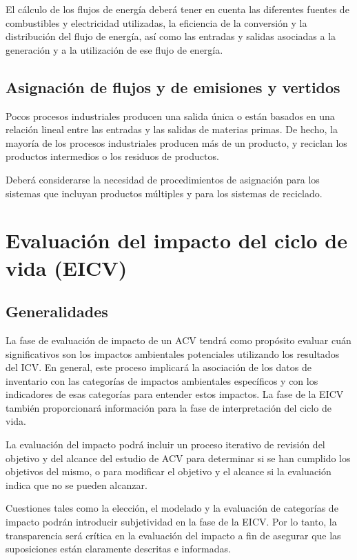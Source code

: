 El cálculo de los flujos de energía deberá tener en cuenta las diferentes fuentes de combustibles y electricidad utilizadas, la eficiencia de la conversión y la distribución del flujo de energía, así como las entradas y salidas asociadas a la generación y a la utilización de ese flujo de energía.

\subsection{Asignación de flujos y de emisiones y vertidos}
Pocos procesos industriales producen una salida única o están basados en una relación lineal entre las entradas y las salidas de materias primas. De hecho, la mayoría de los procesos industriales producen más de un producto, y reciclan los productos intermedios o los residuos de productos.

Deberá considerarse la necesidad de procedimientos de asignación para los sistemas que incluyan productos múltiples y para los sistemas de reciclado.

\section{Evaluación del impacto del ciclo de vida (EICV)}
\subsection{Generalidades}
La fase de evaluación de impacto de un ACV tendrá como propósito evaluar cuán significativos son los impactos ambientales potenciales utilizando los resultados del ICV. En general, este proceso implicará la asociación de los datos de inventario con las categorías de impactos ambientales específicos y con los indicadores de esas categorías para entender estos impactos. La fase de la EICV también proporcionará información para la fase de interpretación del ciclo de vida.

La evaluación del impacto podrá incluir un proceso iterativo de revisión del objetivo y del alcance del estudio de ACV para determinar si se han cumplido los objetivos del mismo, o para modificar el objetivo y el alcance si la evaluación indica que no se pueden alcanzar.

Cuestiones tales como la elección, el modelado y la evaluación de categorías de impacto podrán introducir subjetividad en la fase de la EICV. Por lo tanto, la transparencia será crítica en la evaluación del impacto a fin de asegurar que las suposiciones están claramente descritas e informadas.


